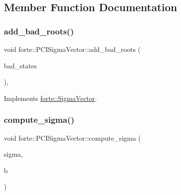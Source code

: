 \subsection{Member Function Documentation}
\mbox{\label{classforte_1_1_p_c_i_sigma_vector_a4ed2811d6e69abd2b542c7749174c9d3}} 
\subsubsection{\texorpdfstring{add\+\_\+bad\+\_\+roots()}{add\_bad\_roots()}}
{\footnotesize\ttfamily void forte\+::\+P\+C\+I\+Sigma\+Vector\+::add\+\_\+bad\+\_\+roots (\begin{DoxyParamCaption}\item[{std\+::vector$<$ std\+::vector$<$ std\+::pair$<$ size\+\_\+t, double $>$$>$$>$ \&}]{bad\+\_\+states }\end{DoxyParamCaption})\hspace{0.3cm}{\ttfamily [override]}, {\ttfamily [virtual]}}



Implements \mbox{\hyperlink{classforte_1_1_sigma_vector_a5cd950852f515bc082ca1df31bd84e3e}{forte\+::\+Sigma\+Vector}}.

\mbox{\label{classforte_1_1_p_c_i_sigma_vector_ae09ecf8eb9f57ddb386c97603712383f}} 
\subsubsection{\texorpdfstring{compute\+\_\+sigma()}{compute\_sigma()}}
{\footnotesize\ttfamily void forte\+::\+P\+C\+I\+Sigma\+Vector\+::compute\+\_\+sigma (\begin{DoxyParamCaption}\item[{psi\+::\+Shared\+Vector}]{sigma,  }\item[{psi\+::\+Shared\+Vector}]{b }\end{DoxyParamCaption})\hspace{0.3cm}{\ttfamily [override]}}

